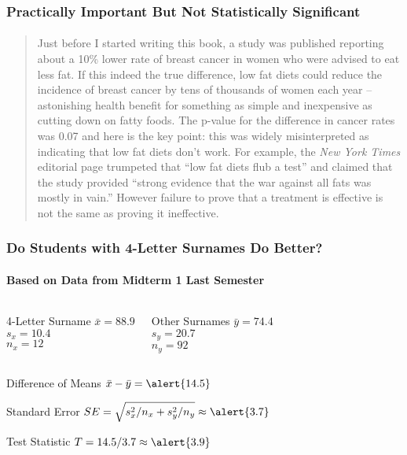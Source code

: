\documentclass{beamer}
\begin{document}
\begin{frame}
\frametitle{Practically Important But Not Statistically Significant}
\framesubtitle{\href{http://www.amazon.com/p-value-Stories-Actually-Understand-Statistics/dp/0321629302}{}}
\footnotesize
\begin{quote}
Just before I started writing this book, a study was published reporting about a 10\% lower rate of breast cancer in women who were advised to eat less fat. If this indeed the true difference, low fat diets could reduce the incidence of breast cancer by tens of thousands of women each year -- astonishing health benefit for something as simple and inexpensive as cutting down on fatty foods. The p-value for the difference in cancer rates was 0.07 and here is the key point: this was widely misinterpreted as indicating that low fat diets don't work. For example, the \emph{New York Times} editorial page trumpeted that ``low fat diets flub a test'' and claimed that the study provided ``strong evidence that the war against all fats was mostly in vain.'' \alert{However failure to prove that a treatment is effective is not the same as proving it ineffective.}
\end{quote}
\end{frame}
\begin{frame}[c]\frametitle{Do Students with 4-Letter Surnames Do Better?}
 \framesubtitle{Based on Data from Midterm 1 Last Semester}
    \begin{columns}
    	 \begin{block}
    		{4-Letter Surname}
    			$\bar{x} = 88.9$\\
    			$s_x = 10.4$\\
    			$n_x = 12$
    	\end{block} 
    	 \begin{block}
    		{Other Surnames}
    			$\bar{y} = 74.4$\\
    			$s_y = 20.7$\\
    			$n_y = 92$
    	\end{block}
    \end{columns}

\vspace{1em}
\begin{block}
	{Difference of Means}
	$\bar{x} - \bar{y} = \alert{14.5}$
\end{block}
\begin{block}
	{Standard Error}
	$\displaystyle SE = \sqrt{s_x^2/n_x + s_y^2/n_y} \approx \alert{3.7}$
\end{block}
\begin{block}
	{Test Statistic}
	$T = 14.5 / 3.7 \approx \alert{3.9}$
\end{block}
\end{frame}
\end{document}

